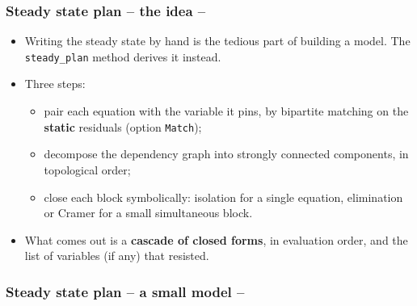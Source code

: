 \documentclass[10pt,slidestop]{beamer}
\theoremstyle{plain}
\begin{document}

\begin{frame}[c,fragile]
  \frametitle{Steady state plan -- the idea --}

  \begin{itemize}

  \item Writing the steady state by hand is the tedious part of building a
    model. The \verb+steady_plan+ method derives it instead.\newline

  \item Three steps:
    \begin{itemize}
    \item[--] pair each equation with the variable it pins, by bipartite
      matching on the \textbf{static} residuals (option \verb+Match+);
    \item[--] decompose the dependency graph into strongly connected components,
      in topological order;
    \item[--] close each block symbolically: isolation for a single equation,
      elimination or Cramer for a small simultaneous block.
    \end{itemize}

  \item What comes out is a \textbf{cascade of closed forms}, in evaluation
    order, and the list of variables (if any) that resisted.

  \end{itemize}

\end{frame}


\begin{frame}[c,fragile]
  \frametitle{Steady state plan -- a small model --}

  

\end{frame}
\end{document}
